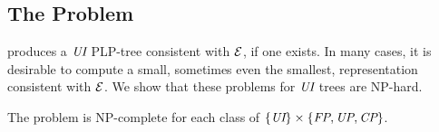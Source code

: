 \vspace{-0.1cm}
\subsection{The  Problem}

\vspace{-0.1cm}
 produces a $\textit{UI}$ PLP-tree consistent with $\mathcal{E}$, if one exists.
In many cases, it is desirable to compute a small, sometimes even the smallest, 
representation consistent with $\mathcal{E}$.
We show that these problems for $\textit{UI}$ trees are NP-hard.

\begin{thm}
\label{thm:UIFP_smallest_decision}
	The  problem is NP-complete for each class of $\{\textit{UI}\} \times \{\textit{FP},\textit{UP},\textit{CP}\}$.
\end{thm}
